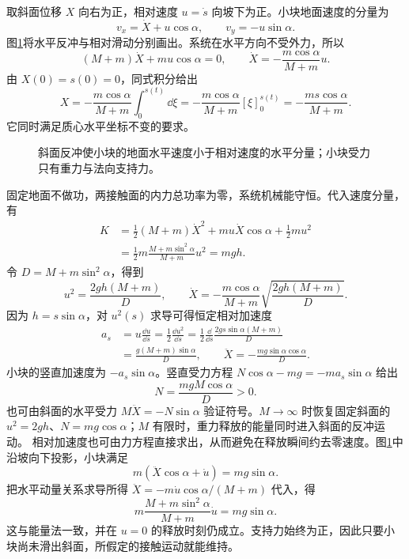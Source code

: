 \begin{solution}
取斜面位移 $X$ 向右为正，相对速度 $u=\dot s$ 向坡下为正。小块地面速度的分量为
\[
v_x=\dot X+u\cos\alpha,\qquad v_y=-u\sin\alpha.
\]
图\ref{deep3:fig:d3-e5-s}将水平反冲与相对滑动分别画出。系统在水平方向不受外力，所以
\[
(M+m)\dot X+mu\cos\alpha=0,
\qquad \dot X=-\frac{m\cos\alpha}{M+m}u.
\]
由 $X(0)=s(0)=0$，同式积分给出
\[
X=-\frac{m\cos\alpha}{M+m}\int_0^{s(t)}\dd\xi
=-\frac{m\cos\alpha}{M+m}[\xi]_0^{s(t)}
=-\frac{ms\cos\alpha}{M+m}.
\]
它同时满足质心水平坐标不变的要求。
\begin{figure}[H]\centering
{}
\caption{斜面反冲使小块的地面水平速度小于相对速度的水平分量；小块受力只有重力与法向支持力。}\label{deep3:fig:d3-e5-s}
\end{figure}
固定地面不做功，两接触面的内力总功率为零，系统机械能守恒。代入速度分量，有
\begin{align*}
K&=\frac12(M+m)\dot X^2+mu\dot X\cos\alpha+\frac12mu^2\\
 &=\frac12m\frac{M+m\sin^2\alpha}{M+m}u^2=mgh.
\end{align*}
令 $D=M+m\sin^2\alpha$，得到
\[
u^2=\frac{2gh(M+m)}D,\qquad
\dot X=-\frac{m\cos\alpha}{M+m}\sqrt{\frac{2gh(M+m)}D}.
\]
因为 $h=s\sin\alpha$，对 $u^2(s)$ 求导可得恒定相对加速度
\[
\begin{aligned}
a_s&=u\frac{\dd u}{\dd s}=\frac12\frac{\dd u^2}{\dd s}
=\frac12\frac{\dd}{\dd s}\frac{2gs\sin\alpha(M+m)}D\\
&=\frac{g(M+m)\sin\alpha}D,\qquad
\ddot X=-\frac{mg\sin\alpha\cos\alpha}D.
\end{aligned}
\]
小块的竖直加速度为 $-a_s\sin\alpha$。竖直受力方程
$N\cos\alpha-mg=-ma_s\sin\alpha$ 给出
\[
N=\frac{mgM\cos\alpha}D>0.
\]
也可由斜面的水平受力 $M\ddot X=-N\sin\alpha$ 验证符号。$M\to\infty$ 时恢复固定斜面的 $u^2=2gh$、$N=mg\cos\alpha$；$M$ 有限时，重力释放的能量同时进入斜面的反冲运动。
相对加速度也可由力方程直接求出，从而避免在释放瞬间约去零速度。图\ref{deep3:fig:d3-e5-s}中沿坡向下投影，小块满足
\[
m(\ddot X\cos\alpha+\dot u)=mg\sin\alpha.
\]
把水平动量关系求导所得 $\ddot X=-m\dot u\cos\alpha/(M+m)$ 代入，得
\[
m\frac{M+m\sin^2\alpha}{M+m}\dot u=mg\sin\alpha.
\]
这与能量法一致，并在 $u=0$ 的释放时刻仍成立。支持力始终为正，因此只要小块尚未滑出斜面，所假定的接触运动就能维持。

\end{solution}



